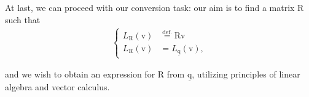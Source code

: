 \bigskip At last, we can proceed with our conversion task: our aim is to find a matrix $\bm{\mathrm{R}}$ such that
\begin{align*}
\left\{
    \begin{aligned}
    	L_{\bm{\mathrm{R}}}(\bm{\mathrm{v}}) &\stackrel{\text{def.}}{=} \bm{\mathrm{R}}\bm{\mathrm{v}} \\
        L_{\bm{\mathrm{R}}}(\bm{\mathrm{v}}) &= L_{\underline{\bm{\mathrm{q}}}}(\bm{\mathrm{v}}),
    \end{aligned}
\right.
\end{align*}

and we wish to obtain
 an expression for $\bm{\mathrm{R}}$ from $\underline{\bm{\mathrm{q}}}$, utilizing principles of linear algebra and vector calculus.

